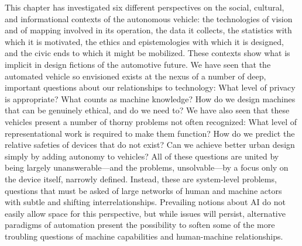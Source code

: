 This chapter has investigated six different perspectives on the
social, cultural, and informational contexts of the autonomous
vehicle:  the technologies of vision and of mapping involved
in its operation, the 
data it collects, the statistics with which it is motivated, the
ethics and epistemologies with which it is designed, and the civic
ends to which it might be mobilized. These contexts show what is implicit in design
fictions of the automotive future. We
have seen that the automated vehicle so envisioned exists at the
nexus of a number of deep, important questions about our relationships
to technology: What level of privacy is appropriate? What counts as machine
knowledge? How do we design machines that can be genuinely ethical,
and do we need to? We have also seen that these vehicles present a
number of thorny problems not often recognized: What level of
representational work is required to make them function? How do we
predict the relative safeties of devices that do not exist? Can we
achieve better urban design simply by adding autonomy to vehicles?
All of these questions are united by being largely unanswerable---and
the problems, unsolvable---by a focus only on the device itself,
narrowly defined. Instead, these are system-level problems, questions
that must be asked of large networks of human and machine actors with
subtle and shifting interrelationships. Prevailing notions about AI do
not easily allow space for this perspective, but while issues will
persist, alternative paradigms of 
automation present the possibility to soften some of the more
troubling questions of machine capabilities and human-machine relationships. 

